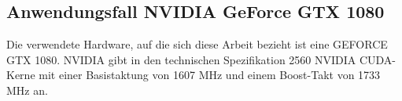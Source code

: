\subsection{Anwendungsfall NVIDIA GeForce GTX 1080}
\label{sub:gtx1080}

Die verwendete Hardware, auf die sich diese Arbeit bezieht ist eine GEFORCE GTX 1080. NVIDIA gibt in den technischen Spezifikation \cite{gtx1080} 2560 NVIDIA CUDA-Kerne mit einer Basistaktung von 1607 MHz und einem Boost-Takt von 1733 MHz an.